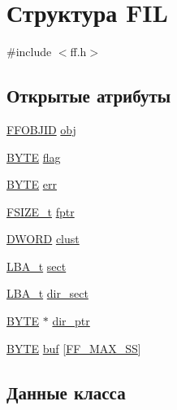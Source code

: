 \hypertarget{struct_f_i_l}{}\section{Структура F\+IL}
\label{struct_f_i_l}


{\ttfamily \#include $<$ff.\+h$>$}

\subsection*{Открытые атрибуты}
\begin{DoxyCompactItemize}
\item 
\mbox{\hyperlink{struct_f_f_o_b_j_i_d}{F\+F\+O\+B\+J\+ID}} \mbox{\hyperlink{struct_f_i_l_ad95b6e85106673b0d7a1855da4d264f4}{obj}}
\item 
\mbox{\hyperlink{ff_8h_a4ae1dab0fb4b072a66584546209e7d58}{B\+Y\+TE}} \mbox{\hyperlink{struct_f_i_l_ac409508881f5a16f2998ae675072b376}{flag}}
\item 
\mbox{\hyperlink{ff_8h_a4ae1dab0fb4b072a66584546209e7d58}{B\+Y\+TE}} \mbox{\hyperlink{struct_f_i_l_aea440945db26de9c4a88065c0c887fda}{err}}
\item 
\mbox{\hyperlink{ff_8h_a3fc0992ad7436250b6b1a0592214b7f2}{F\+S\+I\+Z\+E\+\_\+t}} \mbox{\hyperlink{struct_f_i_l_a088b03ab2e02f82e10e17bdd938190a6}{fptr}}
\item 
\mbox{\hyperlink{ff_8h_ad342ac907eb044443153a22f964bf0af}{D\+W\+O\+RD}} \mbox{\hyperlink{struct_f_i_l_aa41312aba551b9a6d1c9d3c8c7d2734b}{clust}}
\item 
\mbox{\hyperlink{ff_8h_a1f3c30a83148a28340f009d4e583f087}{L\+B\+A\+\_\+t}} \mbox{\hyperlink{struct_f_i_l_aa3f9f9ed9341b765862d073a95c86001}{sect}}
\item 
\mbox{\hyperlink{ff_8h_a1f3c30a83148a28340f009d4e583f087}{L\+B\+A\+\_\+t}} \mbox{\hyperlink{struct_f_i_l_a19e61b116df8e6f2138243998e43f131}{dir\+\_\+sect}}
\item 
\mbox{\hyperlink{ff_8h_a4ae1dab0fb4b072a66584546209e7d58}{B\+Y\+TE}} $\ast$ \mbox{\hyperlink{struct_f_i_l_a5af9e9fb312b629220eaf684dd28c4a9}{dir\+\_\+ptr}}
\item 
\mbox{\hyperlink{ff_8h_a4ae1dab0fb4b072a66584546209e7d58}{B\+Y\+TE}} \mbox{\hyperlink{struct_f_i_l_ac2aa36f0fa61cd82f905173d51f719b0}{buf}} \mbox{[}\mbox{\hyperlink{ffconf_8h_a104c36ee46f9d6e76dadf37f3d9696cc}{F\+F\+\_\+\+M\+A\+X\+\_\+\+SS}}\mbox{]}
\end{DoxyCompactItemize}


\subsection{Данные класса}
\mbox{\label{struct_f_i_l_ac2aa36f0fa61cd82f905173d51f719b0}} 
